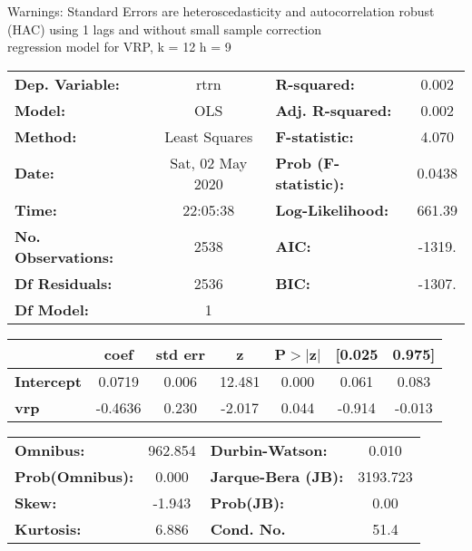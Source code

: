 Warnings: \newline
 [1] Standard Errors are heteroscedasticity and autocorrelation robust (HAC) using 1 lags and without small sample correction\\ 

regression model for VRP, k = 12 h = 9\begin{center}
\begin{tabular}{lclc}
\toprule
\textbf{Dep. Variable:}    &       rtrn       & \textbf{  R-squared:         } &     0.002   \\
\textbf{Model:}            &       OLS        & \textbf{  Adj. R-squared:    } &     0.002   \\
\textbf{Method:}           &  Least Squares   & \textbf{  F-statistic:       } &     4.070   \\
\textbf{Date:}             & Sat, 02 May 2020 & \textbf{  Prob (F-statistic):} &   0.0438    \\
\textbf{Time:}             &     22:05:38     & \textbf{  Log-Likelihood:    } &    661.39   \\
\textbf{No. Observations:} &        2538      & \textbf{  AIC:               } &    -1319.   \\
\textbf{Df Residuals:}     &        2536      & \textbf{  BIC:               } &    -1307.   \\
\textbf{Df Model:}         &           1      & \textbf{                     } &             \\
\bottomrule
\end{tabular}
\begin{tabular}{lcccccc}
                   & \textbf{coef} & \textbf{std err} & \textbf{z} & \textbf{P$> |$z$|$} & \textbf{[0.025} & \textbf{0.975]}  \\
\midrule
\textbf{Intercept} &       0.0719  &        0.006     &    12.481  &         0.000        &        0.061    &        0.083     \\
\textbf{vrp}       &      -0.4636  &        0.230     &    -2.017  &         0.044        &       -0.914    &       -0.013     \\
\bottomrule
\end{tabular}
\begin{tabular}{lclc}
\textbf{Omnibus:}       & 962.854 & \textbf{  Durbin-Watson:     } &    0.010  \\
\textbf{Prob(Omnibus):} &   0.000 & \textbf{  Jarque-Bera (JB):  } & 3193.723  \\
\textbf{Skew:}          &  -1.943 & \textbf{  Prob(JB):          } &     0.00  \\
\textbf{Kurtosis:}      &   6.886 & \textbf{  Cond. No.          } &     51.4  \\
\bottomrule
\end{tabular}
\end{center}

